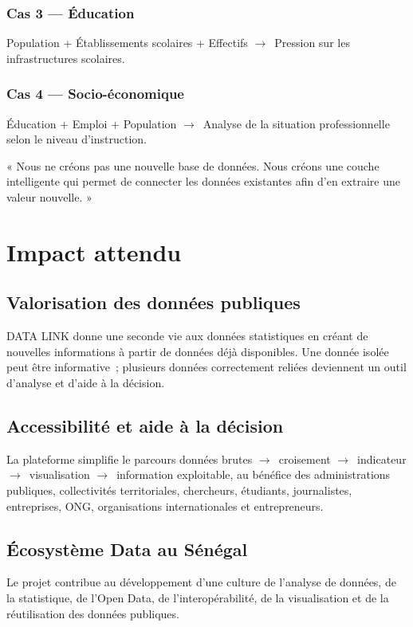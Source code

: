 \documentclass[11pt,a4paper]{article}
\newcommand{\arrowto}{$\rightarrow$}
\begin{document}
\subsubsection*{Cas 3 --- Éducation}
Population + Établissements scolaires + Effectifs \arrowto\ Pression sur les infrastructures scolaires.

\subsubsection*{Cas 4 --- Socio-économique}
Éducation + Emploi + Population \arrowto\ Analyse de la situation professionnelle selon le niveau d'instruction.

\begin{quotebox}
« Nous ne créons pas une nouvelle base de données. Nous créons une couche intelligente qui permet de connecter les données existantes afin d'en extraire une valeur nouvelle. »
\end{quotebox}

\section{Impact attendu}

\subsection{Valorisation des données publiques}
DATA LINK donne une seconde vie aux données statistiques en créant de nouvelles informations à partir de données déjà disponibles. Une donnée isolée peut être informative~; plusieurs données correctement reliées deviennent un outil d'analyse et d'aide à la décision.

\subsection{Accessibilité et aide à la décision}
La plateforme simplifie le parcours données brutes \arrowto\ croisement \arrowto\ indicateur \arrowto\ visualisation \arrowto\ information exploitable, au bénéfice des administrations publiques, collectivités territoriales, chercheurs, étudiants, journalistes, entreprises, ONG, organisations internationales et entrepreneurs.

\subsection{Écosystème Data au Sénégal}
Le projet contribue au développement d'une culture de l'analyse de données, de la statistique, de l'Open Data, de l'interopérabilité, de la visualisation et de la réutilisation des données publiques.
\end{document}
